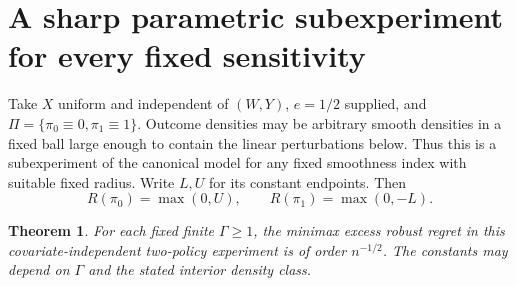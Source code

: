 \documentclass[11pt]{article}
\newtheorem{theorem}{Theorem}
\theoremstyle{definition}
\begin{document}
\section*{A sharp parametric subexperiment for every fixed sensitivity}
Take $X$ uniform and independent of $(W,Y)$, $e=1/2$ supplied, and
$\Pi=\{\pi_0\equiv0,\pi_1\equiv1\}$. Outcome densities may be arbitrary
smooth densities in a fixed ball large enough to contain the linear
perturbations below. Thus this is a subexperiment of the canonical model
for any fixed smoothness index with suitable fixed radius.
Write $L,U$ for its constant endpoints. Then
\[
 R(\pi_0)=\max(0,U),\qquad R(\pi_1)=\max(0,-L).         \tag{4}
\]
\begin{theorem}
For each fixed finite $\Gamma\ge1$, the minimax excess robust regret in
this covariate-independent two-policy experiment is of order $n^{-1/2}$.
The constants may depend on $\Gamma$ and the stated interior density class.
\end{theorem}
\end{document}
